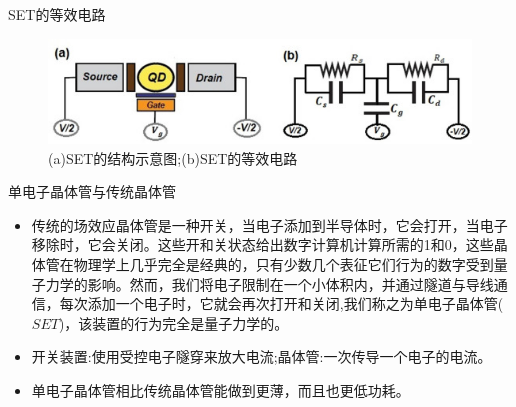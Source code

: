 \documentclass{beamer}[fontset=windows]
\begin{document}
    \begin{frame}
    \begin{block}{SET的等效电路}
        	\begin{figure}[H]
        		\centering
        		\hspace{2em}\includegraphics[width=1.0\linewidth]{pic/2.jpg}
        		\caption{(a)SET的结构示意图;(b)SET的等效电路\cite{MOULHIM2020114078}
        		}
        	\end{figure}
    \end{block}
    \end{frame}
    \begin{frame}
    \begin{block}{单电子晶体管与传统晶体管}
    \begin{itemize}
    \item 传统的场效应晶体管是一种开关，当电子添加到半导体时，它会打开，当电子移除时，它会关闭。这些开和关状态给出数字计算机计算所需的1和0，这些晶体管在物理学上几乎完全是经典的，只有少数几个表征它们行为的数字受到量子力学的影响。然而，我们将电子限制在一个小体积内，并通过隧道与导线通信，每次添加一个电子时，它就会再次打开和关闭,我们称之为单电子晶体管($SET$)，该装置的行为完全是量子力学的。
    \item 开关装置:使用受控电子隧穿来放大电流;晶体管:一次传导一个电子的电流。
    \item 单电子晶体管相比传统晶体管能做到更薄，而且也更低功耗。
    \end{itemize}
    \end{block}
    \end{frame}
\end{document}
